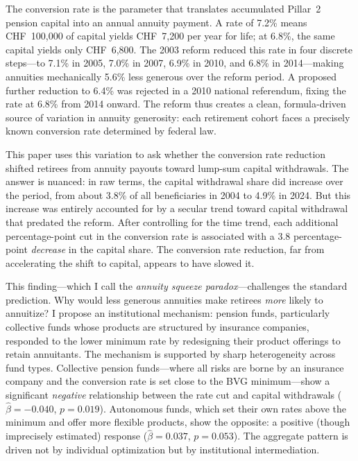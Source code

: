 \documentclass[12pt]{article}
\begin{document}
The conversion rate is the parameter that translates accumulated Pillar~2 pension capital into an annual annuity payment. A rate of 7.2\% means CHF~100,000 of capital yields CHF~7,200 per year for life; at 6.8\%, the same capital yields only CHF~6,800. The 2003 reform reduced this rate in four discrete steps---to 7.1\% in 2005, 7.0\% in 2007, 6.9\% in 2010, and 6.8\% in 2014---making annuities mechanically 5.6\% less generous over the reform period. A proposed further reduction to 6.4\% was rejected in a 2010 national referendum, fixing the rate at 6.8\% from 2014 onward. The reform thus creates a clean, formula-driven source of variation in annuity generosity: each retirement cohort faces a precisely known conversion rate determined by federal law.

This paper uses this variation to ask whether the conversion rate reduction shifted retirees from annuity payouts toward lump-sum capital withdrawals. The answer is nuanced: in raw terms, the capital withdrawal share did increase over the period, from about 3.8\% of all beneficiaries in 2004 to 4.9\% in 2024. But this increase was entirely accounted for by a secular trend toward capital withdrawal that predated the reform. After controlling for the time trend, each additional percentage-point cut in the conversion rate is associated with a 3.8 percentage-point \textit{decrease} in the capital share. The conversion rate reduction, far from accelerating the shift to capital, appears to have slowed it.

This finding---which I call the \textit{annuity squeeze paradox}---challenges the standard prediction. Why would less generous annuities make retirees \textit{more} likely to annuitize? I propose an institutional mechanism: pension funds, particularly collective funds whose products are structured by insurance companies, responded to the lower minimum rate by redesigning their product offerings to retain annuitants. The mechanism is supported by sharp heterogeneity across fund types. Collective pension funds---where all risks are borne by an insurance company and the conversion rate is set close to the BVG minimum---show a significant \textit{negative} relationship between the rate cut and capital withdrawals ($\hat{\beta} = -0.040$, $p = 0.019$). Autonomous funds, which set their own rates above the minimum and offer more flexible products, show the opposite: a positive (though imprecisely estimated) response ($\hat{\beta} = 0.037$, $p = 0.053$). The aggregate pattern is driven not by individual optimization but by institutional intermediation.
\end{document}
